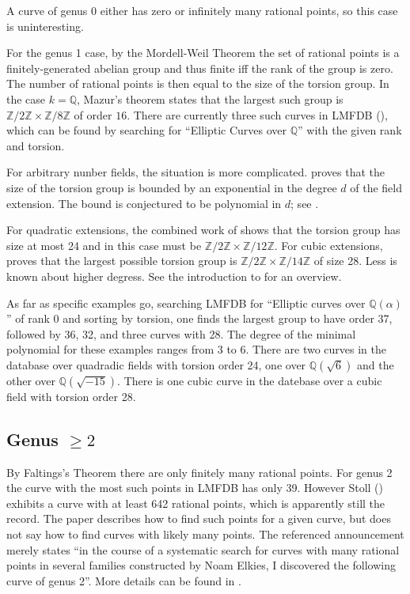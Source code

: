 \documentclass[12pt, reqno]{amsart}
\newcommand{\Q}{{\mathbb Q}}
\newcommand{\Z}{{\mathbb Z}}
\numberwithin{equation}{section}
\numberwithin{table}{section}
\begin{document}
A curve of genus 0 either has zero or infinitely many rational points,
so this case is uninteresting.

For the genus 1 case, by the Mordell-Weil Theorem the set of rational
points is a finitely-generated abelian group and thus finite iff the
rank of the group is zero. The number of rational points is then equal
to the size of the torsion group. In the case $k=\Q$, Mazur's theorem
states that the largest such group is $\Z/2\Z \times \Z/8\Z$ of order
$16$. There are currently three such curves in LMFDB (\cite{lmfdb}),
which can be found by searching for ``Elliptic Curves over $\Q$'' with
the given rank and torsion.

For arbitrary nunber fields, the situation is more
complicated. \cite{Parent1999} proves that the size of the torsion
group is bounded by an exponential in the degree $d$ of the field
extension. The bound is conjectured to be polynomial in $d$; see
\cite{Clark2018}.

For quadratic extensions, the combined work of \cites{Kamienny1992a,
  Kamienny1992b, Kenku1988} shows that the torsion group has size at
most 24 and in this case must be $\Z/2\Z \times \Z/12\Z$. For cubic
extensions, \cite{Derickx2021} proves that the largest possible
torsion group is $\Z/2\Z \times \Z/14\Z$ of size 28. Less is known
about higher degress. See the introduction to \cite{Genao2022} for an
overview.

As far as specific examples go, searching LMFDB for ``Elliptic curves over
$\Q(\alpha)$'' of rank $0$ and sorting by torsion, one finds the largest
group to have order 37, followed by 36, 32, and three curves with
28. The degree of the minimal polynomial for these examples ranges
from 3 to 6. There are two curves in the database over quadradic
fields with torsion order 24, one over $\Q(\sqrt{6})$ and the other
over $\Q(\sqrt{-15})$. There is one cubic curve in the datebase over a
cubic field with torsion order 28.

\subsection{Genus \texorpdfstring{$\ge 2$}{≥ 2}}

By Faltings's Theorem there are only finitely many rational points. For
genus 2 the curve with the most such points in LMFDB has only 39. However Stoll
(\cite{Muller2016}) exhibits a curve with at least 642 rational
points, which is apparently still the record. The paper describes how
to find such points for a given curve, but does not say how to find
curves with likely many points. The referenced announcement
\cite{Stoll2008} merely states ``in the course of a systematic search
for curves with many rational points in several families constructed
by Noam Elkies, I discovered the following curve of genus 2''. More
details can be found in \cite{Stoll2015}.
\end{document}
